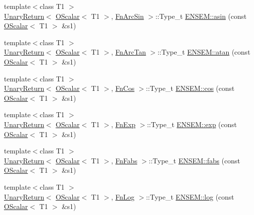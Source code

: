 \begin{DoxyCompactItemize}
\item 
{\footnotesize template$<$class T1 $>$ }\\\mbox{\hyperlink{structENSEM_1_1UnaryReturn}{Unary\+Return}}$<$ \mbox{\hyperlink{classENSEM_1_1OScalar}{O\+Scalar}}$<$ T1 $>$, \mbox{\hyperlink{structENSEM_1_1FnArcSin}{Fn\+Arc\+Sin}} $>$\+::Type\+\_\+t \mbox{\hyperlink{group__obsscalar_gac74c6933e6f290335c2ec508825d5fbb}{E\+N\+S\+E\+M\+::asin}} (const \mbox{\hyperlink{classENSEM_1_1OScalar}{O\+Scalar}}$<$ T1 $>$ \&s1)
\item 
{\footnotesize template$<$class T1 $>$ }\\\mbox{\hyperlink{structENSEM_1_1UnaryReturn}{Unary\+Return}}$<$ \mbox{\hyperlink{classENSEM_1_1OScalar}{O\+Scalar}}$<$ T1 $>$, \mbox{\hyperlink{structENSEM_1_1FnArcTan}{Fn\+Arc\+Tan}} $>$\+::Type\+\_\+t \mbox{\hyperlink{group__obsscalar_ga785cb0a8ba60f6a9a1f4494b5ac2533d}{E\+N\+S\+E\+M\+::atan}} (const \mbox{\hyperlink{classENSEM_1_1OScalar}{O\+Scalar}}$<$ T1 $>$ \&s1)
\item 
{\footnotesize template$<$class T1 $>$ }\\\mbox{\hyperlink{structENSEM_1_1UnaryReturn}{Unary\+Return}}$<$ \mbox{\hyperlink{classENSEM_1_1OScalar}{O\+Scalar}}$<$ T1 $>$, \mbox{\hyperlink{structENSEM_1_1FnCos}{Fn\+Cos}} $>$\+::Type\+\_\+t \mbox{\hyperlink{group__obsscalar_gab03cd6386bf0623d4effce724af5c124}{E\+N\+S\+E\+M\+::cos}} (const \mbox{\hyperlink{classENSEM_1_1OScalar}{O\+Scalar}}$<$ T1 $>$ \&s1)
\item 
{\footnotesize template$<$class T1 $>$ }\\\mbox{\hyperlink{structENSEM_1_1UnaryReturn}{Unary\+Return}}$<$ \mbox{\hyperlink{classENSEM_1_1OScalar}{O\+Scalar}}$<$ T1 $>$, \mbox{\hyperlink{structENSEM_1_1FnExp}{Fn\+Exp}} $>$\+::Type\+\_\+t \mbox{\hyperlink{group__obsscalar_ga9d0d193a9c41dfb71083e25b3fdc6a01}{E\+N\+S\+E\+M\+::exp}} (const \mbox{\hyperlink{classENSEM_1_1OScalar}{O\+Scalar}}$<$ T1 $>$ \&s1)
\item 
{\footnotesize template$<$class T1 $>$ }\\\mbox{\hyperlink{structENSEM_1_1UnaryReturn}{Unary\+Return}}$<$ \mbox{\hyperlink{classENSEM_1_1OScalar}{O\+Scalar}}$<$ T1 $>$, \mbox{\hyperlink{structENSEM_1_1FnFabs}{Fn\+Fabs}} $>$\+::Type\+\_\+t \mbox{\hyperlink{group__obsscalar_gaab3ff43b1817abbbfb1caf2c90110a0f}{E\+N\+S\+E\+M\+::fabs}} (const \mbox{\hyperlink{classENSEM_1_1OScalar}{O\+Scalar}}$<$ T1 $>$ \&s1)
\item 
{\footnotesize template$<$class T1 $>$ }\\\mbox{\hyperlink{structENSEM_1_1UnaryReturn}{Unary\+Return}}$<$ \mbox{\hyperlink{classENSEM_1_1OScalar}{O\+Scalar}}$<$ T1 $>$, \mbox{\hyperlink{structENSEM_1_1FnLog}{Fn\+Log}} $>$\+::Type\+\_\+t \mbox{\hyperlink{group__obsscalar_gac3f245df6eb6b0c94e6aa959b1e7676c}{E\+N\+S\+E\+M\+::log}} (const \mbox{\hyperlink{classENSEM_1_1OScalar}{O\+Scalar}}$<$ T1 $>$ \&s1)

\end{DoxyCompactItemize}

